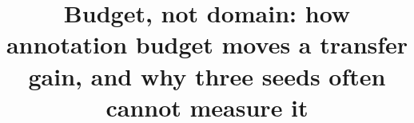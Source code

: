 \documentclass[pdflatex,sn-mathphys-ay]{sn-jnl}
\begin{document}

\author*[1]{ }

\title[Budget, not domain]{Budget, not domain: how annotation budget moves a transfer gain, and why three seeds often cannot measure it}
\end{document}

